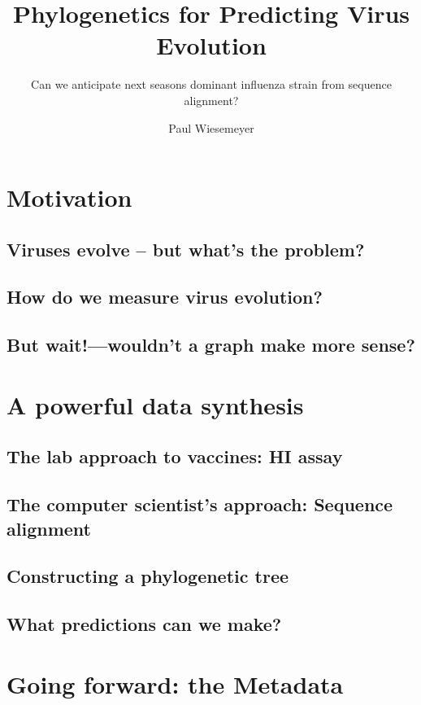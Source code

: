 \documentclass{beamer}
\title{Phylogenetics for Predicting Virus Evolution}
\subtitle{Can we anticipate next seasons dominant influenza strain from sequence alignment?}
\author{Paul Wiesemeyer}
\begin{document}
  \shorthandoff{-}
  \frame{\maketitle}

    
  \begin{darkframes}
  \section{Motivation}
    \subsection{Viruses evolve -- but what's the problem?}
    \subsection{How do we measure virus evolution?}
    \subsection{But wait!---wouldn't a graph make more sense?}
  \section{A powerful data synthesis}
    \subsection{The lab approach to vaccines: HI assay}
    \subsection{The computer scientist's approach: Sequence alignment}
    \subsection{Constructing a phylogenetic tree}
    \subsection{What predictions can we make?}
  \section{Going forward: the Metadata}

\end{darkframes}
\end{document}
